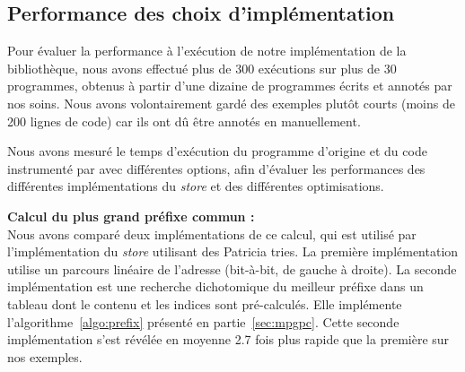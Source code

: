 \subsection{Performance des choix d'implémentation}


Pour évaluer la performance à l'exécution de notre implémentation de la
bibliothèque, nous avons effectué plus de 300 exécutions sur plus de 30
programmes, obtenus à partir d'une dizaine de programmes écrits et annotés par
nos soins.
Nous avons volontairement gardé des exemples plutôt courts (moins de 200 lignes
de code) car ils ont dû être annotés en \eacsl manuellement.

Nous avons mesuré le temps d'exécution du programme d'origine et du code
instrumenté par \eacsltoc avec différentes options, afin d'évaluer les
performances des différentes implémentations du {\em store} et des différentes
optimisations.


\textbf{Calcul du plus grand préfixe commun :} \\
Nous avons comparé deux implémentations de ce calcul, qui est utilisé par
l'implémentation du {\em store} utilisant des Patricia tries.
La première implémentation utilise un parcours linéaire de l'adresse (bit-à-bit,
de gauche à droite).
La seconde implémentation est une recherche dichotomique du meilleur préfixe
dans un tableau dont le contenu et les indices sont pré-calculés.
Elle implémente l'algorithme~\ref{algo:prefix} présenté en
partie~\ref{sec:mpgpc}.
Cette seconde implémentation s'est révélée en moyenne 2.7 fois plus rapide que
la première sur nos exemples.


